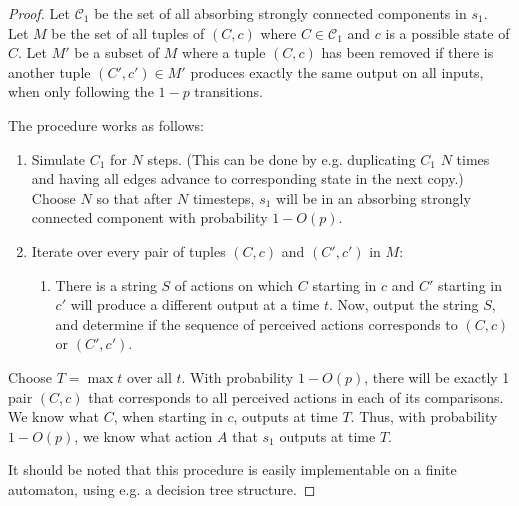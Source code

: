 \documentclass[11pt]{amsart}
\theoremstyle{definition}
\theoremstyle{remark}
\begin{document}
      \begin{proof}
          Let $\mathcal{C}_1$ be the set of all absorbing strongly connected components in $s_1$.
           Let $M$ be the set of all tuples of $(C, c)$ where $C \in \mathcal{C}_1$ and $c$ is a possible state of $C$. Let $M'$ be a subset of $M$ where a tuple $(C, c)$ has been removed if there is another tuple $(C', c') \in M'$ produces exactly the same output on all inputs, when only following the $1-p$ transitions.

        The procedure works as follows:
        \begin{enumerate}
          \item Simulate $C_1$ for $N$ steps. (This can be done by e.g. duplicating $C_1$ $N$ times and having all edges advance to corresponding state in the next copy.) Choose $N$ so that after $N$ timesteps, $s_1$ will be in an absorbing strongly connected component with probability $1 - O(p)$. 
          \item Iterate over every pair of tuples $(C,c)$ and $(C', c')$ in $M$:
          \begin{enumerate}
            \item There is a string $S$ of actions on which $C$ starting in $c$ and $C'$ starting in $c'$ will produce a different output at a time $t$. Now, output the string $S$, and determine if the sequence of perceived actions corresponds to $(C,c)$ or $(C', c')$.
          \end{enumerate}
        \end{enumerate}
        Choose $T = \max t$ over all $t$.
         With probability $1 - O(p)$, there will be exactly 1 pair $(C, c)$ that corresponds to all perceived actions in each of its comparisons. We know what $C$, when starting in $c$, outputs at time $T$. Thus, with probability $1 - O(p)$, we know what action $A$ that $s_1$ outputs at time $T$.

        It should be noted that this procedure is easily implementable on a finite automaton, using e.g. a decision tree structure.
      \end{proof}


\end{document}
